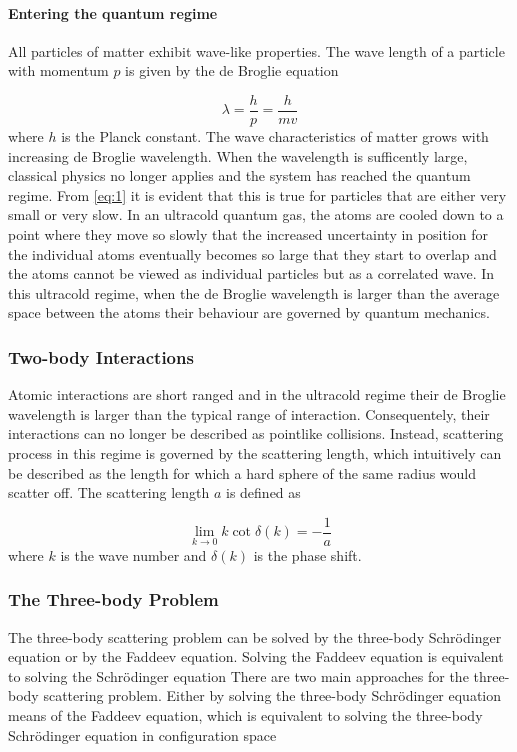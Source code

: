 \documentclass{article}
\begin{document}
\paragraph{Entering the quantum regime}
All particles of matter exhibit wave-like properties. The wave length of a particle with momentum $p$ is given by the de Broglie equation

\begin{equation} \label{eq:1}
\lambda = \frac{h}{p} = \frac{h}{mv}
\end{equation}
where $h$ is the Planck constant. The wave characteristics of matter grows with increasing de Broglie wavelength. When the wavelength is sufficently large, classical physics no longer applies and the system has reached the quantum regime. From \eqref{eq:1} it is evident that this is true for particles that are either very small or very slow. In an ultracold quantum gas, the atoms are cooled down to a point where they move so slowly that the increased uncertainty in position for the individual atoms eventually becomes so large that they start to overlap and the atoms cannot be viewed as individual particles but as a correlated wave. In this ultracold regime, when the de Broglie wavelength is larger than the average space between the atoms their behaviour are governed by quantum mechanics. 
 
\subsubsection{Two-body Interactions}
Atomic interactions are short ranged and in the ultracold regime their de Broglie wavelength is larger than the typical range of interaction. Consequentely, their interactions can no longer be described as pointlike collisions. Instead, scattering process in this regime is governed by the scattering length, which intuitively can be described as the length for which a hard sphere of the same radius would scatter off. The scattering length $a$ is defined as

\begin{equation} \label{eq:2}
\lim_{k \to 0} k \cot \delta(k) = -\frac{1}{a}
\end{equation}
where $k$ is the wave number and $\delta(k)$ is the phase shift.

\subsubsection{The Three-body Problem}
The three-body scattering problem can be solved by the three-body Schr{\"o}dinger equation or by the Faddeev equation. Solving the Faddeev equation is equivalent to solving the Schr{\"o}dinger equation 
There are two main approaches for the three-body scattering problem. Either by solving the three-body Schr{\"o}dinger equation means of the Faddeev equation, which is equivalent to solving the three-body Schr{\"o}dinger equation in configuration space   
\end{document}
